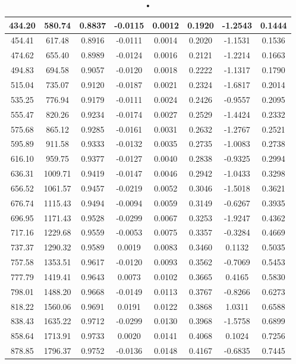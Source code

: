 \documentclass[twoside,colorback,accentcolor=tud4c,11pt]{tudreport}
\begin{document}
\begin{table}[H]
\begin{tabular}{|c|c|c|c|c|c|c|c|}
\hline
434.20 & 580.74 & 0.8837 & -0.0115 & 0.0012 & 0.1920 & -1.2543 & 0.1444 \\
\hline
454.41 & 617.48 & 0.8916 & -0.0111 & 0.0014 & 0.2020 & -1.1531 & 0.1536 \\
\hline
474.62 & 655.40 & 0.8989 & -0.0124 & 0.0016 & 0.2121 & -1.2214 & 0.1663 \\
\hline
494.83 & 694.58 & 0.9057 & -0.0120 & 0.0018 & 0.2222 & -1.1317 & 0.1790 \\
\hline
515.04 & 735.07 & 0.9120 & -0.0187 & 0.0021 & 0.2324 & -1.6817 & 0.2014 \\
\hline
535.25 & 776.94 & 0.9179 & -0.0111 & 0.0024 & 0.2426 & -0.9557 & 0.2095 \\
\hline
555.47 & 820.26 & 0.9234 & -0.0174 & 0.0027 & 0.2529 & -1.4424 & 0.2332 \\
\hline
575.68 & 865.12 & 0.9285 & -0.0161 & 0.0031 & 0.2632 & -1.2767 & 0.2521 \\
\hline
595.89 & 911.58 & 0.9333 & -0.0132 & 0.0035 & 0.2735 & -1.0083 & 0.2738 \\
\hline
616.10 & 959.75 & 0.9377 & -0.0127 & 0.0040 & 0.2838 & -0.9325 & 0.2994 \\
\hline
636.31 & 1009.71 & 0.9419 & -0.0147 & 0.0046 & 0.2942 & -1.0433 & 0.3298 \\
\hline
656.52 & 1061.57 & 0.9457 & -0.0219 & 0.0052 & 0.3046 & -1.5018 & 0.3621 \\
\hline
676.74 & 1115.43 & 0.9494 & -0.0094 & 0.0059 & 0.3149 & -0.6267 & 0.3935 \\
\hline
696.95 & 1171.43 & 0.9528 & -0.0299 & 0.0067 & 0.3253 & -1.9247 & 0.4362 \\
\hline
717.16 & 1229.68 & 0.9559 & -0.0053 & 0.0075 & 0.3357 & -0.3284 & 0.4669 \\
\hline
737.37 & 1290.32 & 0.9589 & 0.0019 & 0.0083 & 0.3460 & 0.1132 & 0.5035 \\
\hline
757.58 & 1353.51 & 0.9617 & -0.0120 & 0.0093 & 0.3562 & -0.7069 & 0.5453 \\
\hline
777.79 & 1419.41 & 0.9643 & 0.0073 & 0.0102 & 0.3665 & 0.4165 & 0.5830 \\
\hline
798.01 & 1488.20 & 0.9668 & -0.0149 & 0.0113 & 0.3767 & -0.8266 & 0.6273 \\
\hline
818.22 & 1560.06 & 0.9691 & 0.0191 & 0.0122 & 0.3868 & 1.0311 & 0.6588 \\
\hline
838.43 & 1635.22 & 0.9712 & -0.0299 & 0.0130 & 0.3968 & -1.5758 & 0.6899 \\
\hline
858.64 & 1713.91 & 0.9733 & 0.0020 & 0.0141 & 0.4068 & 0.1024 & 0.7256 \\
\hline
878.85 & 1796.37 & 0.9752 & -0.0136 & 0.0148 & 0.4167 & -0.6835 & 0.7445 \\
\hline
\end{tabular} 
\caption{•}\label{tab:P}
\end{table}
\end{document}
